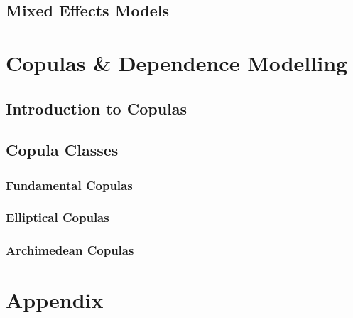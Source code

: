 \documentclass[12pt]{article}
\numberwithin{equation}{section}
\numberwithin{table}{section}
\numberwithin{figure}{section}
\begin{document}
\subsection{Mixed Effects Models} \label{ssec:mixed_models}

%
\clearpage

\section{Copulas \& Dependence Modelling} \label{sec:copulas_and_dependence_moelling}

\subsection{Introduction to Copulas} \label{ssec:intro_to_copulas}

\subsection{Copula Classes} \label{ssec:copula_classes}

\subsubsection{Fundamental Copulas} \label{sssec:fundamental_copulas}

\subsubsection{Elliptical Copulas} \label{sssec:elliptical_copulas}
%
\subsubsection{Archimedean Copulas} \label{sssec:archimedean_copulas}
%




\clearpage





%


\section*{Appendix} \label{sec:appendix}

\clearpage
\end{document}
